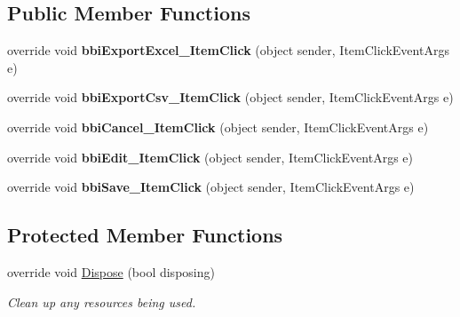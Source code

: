 \subsection*{Public Member Functions}
\begin{DoxyCompactItemize}
\item 
\mbox{\label{class_h_k_supply_1_1_forms_1_1_master_1_1_prototype_management_ae8aca5d8c5e8c5340ad2b5dd327ae255}} 
override void {\bfseries bbi\+Export\+Excel\+\_\+\+Item\+Click} (object sender, Item\+Click\+Event\+Args e)
\item 
\mbox{\label{class_h_k_supply_1_1_forms_1_1_master_1_1_prototype_management_a57c5e746cf575f86b0cf0e500487f7aa}} 
override void {\bfseries bbi\+Export\+Csv\+\_\+\+Item\+Click} (object sender, Item\+Click\+Event\+Args e)
\item 
\mbox{\label{class_h_k_supply_1_1_forms_1_1_master_1_1_prototype_management_a64fdc25d71bf7a17265f7dc01f7204a1}} 
override void {\bfseries bbi\+Cancel\+\_\+\+Item\+Click} (object sender, Item\+Click\+Event\+Args e)
\item 
\mbox{\label{class_h_k_supply_1_1_forms_1_1_master_1_1_prototype_management_ae1b12395b731a978ca2d5c7404846978}} 
override void {\bfseries bbi\+Edit\+\_\+\+Item\+Click} (object sender, Item\+Click\+Event\+Args e)
\item 
\mbox{\label{class_h_k_supply_1_1_forms_1_1_master_1_1_prototype_management_a99f3e89dba7c8032523a8653b26303e3}} 
override void {\bfseries bbi\+Save\+\_\+\+Item\+Click} (object sender, Item\+Click\+Event\+Args e)
\end{DoxyCompactItemize}
\subsection*{Protected Member Functions}
\begin{DoxyCompactItemize}
\item 
override void \mbox{\hyperlink{class_h_k_supply_1_1_forms_1_1_master_1_1_prototype_management_a4c4a0740e023fa6eed0d1648fb5f7c33}{Dispose}} (bool disposing)
\begin{DoxyCompactList}\small\item\em Clean up any resources being used. \end{DoxyCompactList}\end{DoxyCompactItemize}
